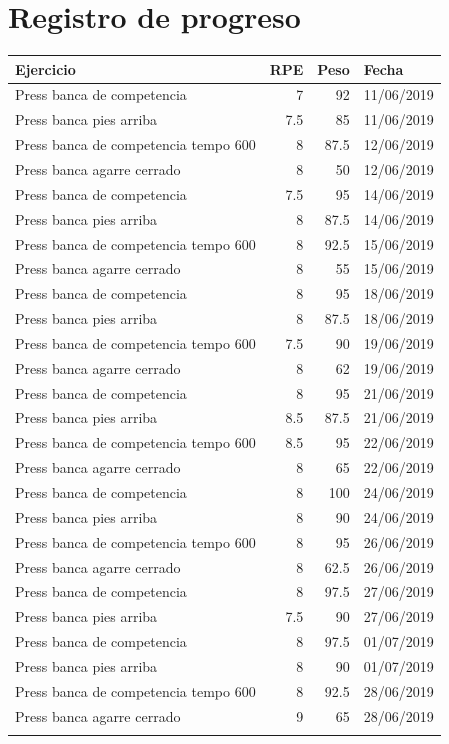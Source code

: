 \documentclass[11pt]{article}
\begin{document}
\section{Registro de progreso}
\label{sec:org4d95642}
\begin{center}
\label{tab:orgca49a98}
\begin{tabular}{lrrl}
Ejercicio & RPE & Peso & Fecha\\
\hline
Press banca de competencia & 7 & 92 & 11/06/2019\\
Press banca pies arriba & 7.5 & 85 & 11/06/2019\\
Press banca de competencia tempo 600 & 8 & 87.5 & 12/06/2019\\
Press banca agarre cerrado & 8 & 50 & 12/06/2019\\
Press banca de competencia & 7.5 & 95 & 14/06/2019\\
Press banca pies arriba & 8 & 87.5 & 14/06/2019\\
Press banca de competencia tempo 600 & 8 & 92.5 & 15/06/2019\\
Press banca agarre cerrado & 8 & 55 & 15/06/2019\\
Press banca de competencia & 8 & 95 & 18/06/2019\\
Press banca pies arriba & 8 & 87.5 & 18/06/2019\\
Press banca de competencia tempo 600 & 7.5 & 90 & 19/06/2019\\
Press banca agarre cerrado & 8 & 62 & 19/06/2019\\
Press banca de competencia & 8 & 95 & 21/06/2019\\
Press banca pies arriba & 8.5 & 87.5 & 21/06/2019\\
Press banca de competencia tempo 600 & 8.5 & 95 & 22/06/2019\\
Press banca agarre cerrado & 8 & 65 & 22/06/2019\\
Press banca de competencia & 8 & 100 & 24/06/2019\\
Press banca pies arriba & 8 & 90 & 24/06/2019\\
Press banca de competencia tempo 600 & 8 & 95 & 26/06/2019\\
Press banca agarre cerrado & 8 & 62.5 & 26/06/2019\\
Press banca de competencia & 8 & 97.5 & 27/06/2019\\
Press banca pies arriba & 7.5 & 90 & 27/06/2019\\
Press banca de competencia & 8 & 97.5 & 01/07/2019\\
Press banca pies arriba & 8 & 90 & 01/07/2019\\
Press banca de competencia tempo 600 & 8 & 92.5 & 28/06/2019\\
Press banca agarre cerrado & 9 & 65 & 28/06/2019\\
 &  &  & \\
\end{tabular}
\end{center}
\end{document}

